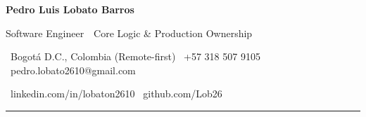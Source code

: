 \documentclass[10pt,a4paper]{article}
\begin{document}
{\fontsize{26}{30}\selectfont\color{ink}\bfseries Pedro Luis Lobato Barros}\par
\vspace{0.6ex}
{\large\color{navy} Software Engineer\, \textbar\, Core Logic \& Production Ownership}\par
\vspace{1.1ex}
{\small\color{slate}%
  \faMapMarker*\ Bogotá D.C., Colombia (Remote-first) \quad
  \faPhone*\ +57 318 507 9105 \quad
  \faEnvelope\ pedro.lobato2610@gmail.com\par
  \vspace{0.4ex}
  \faLinkedin\ linkedin.com/in/lobaton2610 \quad
  \faGithub\ github.com/Lob26}\par
\vspace{0.6ex}
{\color{navy}\rule{\linewidth}{1.2pt}}
\vspace{1.4ex}
\end{document}
